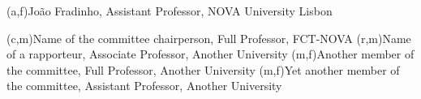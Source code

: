 
(a,f){João Fradinho, Assistant Professor, NOVA University Lisbon}

(c,m){Name of the committee chairperson, Full Professor, FCT-NOVA}
(r,m){Name of a rapporteur, Associate Professor, Another University}
(m,f){Another member of the committee, Full Professor, Another University}
(m,f){Yet another member of the committee, Assistant Professor, Another University}
